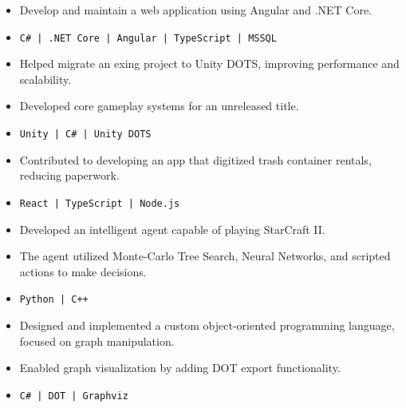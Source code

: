 \documentclass[10pt,a4paper,withhyper]{altacv}
\begin{document}
\begin{paracol}{2}

\begin{itemize}
\item Develop and maintain a web application using Angular and .NET Core.
\item[] \color{black}\texttt{C\# | .NET Core | Angular | TypeScript | MSSQL}
\end{itemize}

\divider

\begin{itemize}
\item Helped migrate an exing project to Unity DOTS, improving performance and scalability.
\item Developed core gameplay systems for an unreleased title.
\item[] \color{black}\texttt{Unity | C\# | Unity DOTS}
\end{itemize}

\divider

\begin{itemize}
\item Contributed to developing an app that digitized trash container rentals, reducing paperwork.
\item[] \color{black}\texttt{React | TypeScript | Node.js}
\end{itemize}


\begin{itemize}
\item Developed an intelligent agent capable of playing StarCraft II. 
\item The agent utilized Monte-Carlo Tree Search, Neural Networks, and scripted actions to make decisions.
\item[] \color{black}\texttt{Python | C++}
\end{itemize}

\divider

\begin{itemize}
\item Designed and implemented a custom object-oriented programming language, focused on graph manipulation.
\item Enabled graph visualization by adding DOT export functionality.
\item[] \color{black}\texttt{C\# | DOT | Graphviz}
\end{itemize}


\end{paracol}
\end{document}
